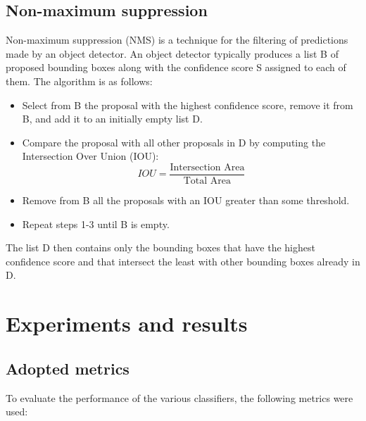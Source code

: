 \documentclass[journal,twocolumn]{IEEEtran}
\begin{document}
\subsection{Non-maximum suppression}

Non-maximum suppression (NMS) is a technique for the
filtering of predictions made by an object detector. An object
detector typically produces a list B of proposed bounding
boxes along with the confidence score S assigned to each of
them. The algorithm is as follows:
\begin{itemize}
\item Select from B the proposal with the highest confidence
score, remove it from B, and add it to an initially empty
list D.
\item Compare the proposal with all other proposals in D by
computing the Intersection Over Union (IOU):
\begin{equation*}
IOU=\frac{\text{Intersection Area}}{\text{Total Area}}
\end{equation*}
\item Remove from B all the proposals with an IOU greater
than some threshold.
\item Repeat steps 1-3 until B is empty.
\end{itemize}

The list D then contains only the bounding boxes that have the highest confidence score and that intersect the least with other bounding boxes already in D.

\section{Experiments and results}
\label{sec:exp}

\subsection{Adopted metrics}

To evaluate the performance of the various classifiers, the following metrics were used:
\end{document}
